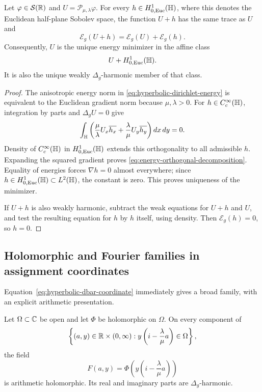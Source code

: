 \begin{theorem}
\label{thm:poisson-energy-minimizer}
Let $\varphi\in\mathcal S(\mathbb{R})$ and
$U=\mathcal P_{\mu,\lambda}\varphi$.  For every
$h\in H_{0,\mathrm{Euc}}^1(\mathbb{H})$, where this denotes the Euclidean half-plane
Sobolev space,
the function $U+h$ has the same trace as $U$ and
\begin{equation}\label{eq:energy-orthogonal-decomposition}
 \mathcal E_g(U+h)=\mathcal E_g(U)+\mathcal E_g(h).
\end{equation}
Consequently, $U$ is the unique energy minimizer in the affine class
\[
 U+H_{0,\mathrm{Euc}}^1(\mathbb{H}).
\]
It is also the unique weakly $\Delta_g$-harmonic member of that class.
\end{theorem}

\begin{proof}
The anisotropic energy norm in
\eqref{eq:hyperbolic-dirichlet-energy} is equivalent to the Euclidean
gradient norm because $\mu,\lambda>0$.  For
$h\in C_c^\infty(\mathbb{H})$, integration by parts and $\Delta_gU=0$ give
\[
 \int_{\mathbb{H}}\left(
  \frac{\mu}{\lambda}U_x\overline{h_x}
 +\frac{\lambda}{\mu}U_y\overline{h_y}\right)dx\,dy=0.
\]
Density of $C_c^\infty(\mathbb{H})$ in $H_{0,\mathrm{Euc}}^1(\mathbb{H})$ extends this orthogonality to
all admissible $h$.  Expanding the squared gradient proves
\eqref{eq:energy-orthogonal-decomposition}.  Equality of energies forces
$\nabla h=0$ almost everywhere; since
$h\in H_{0,\mathrm{Euc}}^1(\mathbb{H})\subset L^2(\mathbb{H})$,
the constant is zero.  This proves uniqueness of the minimizer.

If $U+h$ is also weakly harmonic, subtract the weak equations for $U+h$ and
$U$, and test the resulting equation for $h$ by $h$ itself, using density.
Then $\mathcal E_g(h)=0$, so $h=0$.
\end{proof}

\subsection{Holomorphic and Fourier families in assignment coordinates}

Equation~\eqref{eq:hyperbolic-dbar-coordinate} immediately gives a broad
family, with an explicit arithmetic presentation.

\begin{proposition}
\label{prop:assignment-holomorphic-family}
Let $\Omega\subset\mathbb{C}$ be open and let $\Phi$ be holomorphic on $\Omega$.
On every component of
\[
 \left\{(a,y)\in\mathbb{R}\times(0,\infty):
 y\left(i-\frac{\lambda}{\mu}a\right)\in\Omega\right\},
\]
the field
\begin{equation}\label{eq:assignment-holomorphic-composition}
 F(a,y)=\Phi\!\left(y\left(i-\frac{\lambda}{\mu}a\right)\right)
\end{equation}
is arithmetic holomorphic.  Its real and imaginary parts are
$\Delta_g$-harmonic.
\end{proposition}

